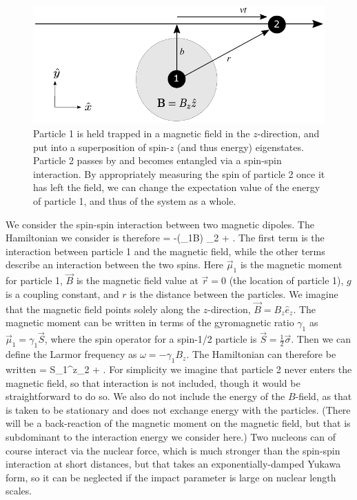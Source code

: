 \documentclass[12pt,aps,prd,onecolumn,nofootinbib,notitlepage]{revtex4-1}
\begin{document}
\begin{figure}[h]
\centering
\includegraphics[width=.6\textwidth]{experiment4.pdf}
\caption{Particle 1 is held trapped in a magnetic field in the $z$-direction, and put into a superposition of spin-$z$ (and thus energy) eigenstates.
Particle 2 passes by and becomes entangled via a spin-spin interaction. By appropriately measuring the spin of particle 2 once it has left the field, we can change the expectation value of the energy of particle 1, and thus of the system as a whole.}
\label{fig:experiment}
\end{figure}

We consider the spin-spin interaction between two magnetic dipoles.
The Hamiltonian we consider is therefore
\be
  \ham =  -({\vec\mu_1}\cdot\vec B) \otimes {}_2
  + .
\ee
The first term is the interaction between particle 1 and the magnetic field, while the other terms describe an interaction between the two spins.
Here $\vec \mu_1$ is the magnetic moment for particle 1, $\vec B$ is the magnetic field value at $\vec r = 0$ (the location of particle 1),  $g$ is a coupling constant, and $r$ is the distance between the particles.
We imagine that the magnetic field points solely along the $z$-direction, $\vec B = B_z\hat{e}_z$.
The magnetic moment can be written in terms of the gyromagnetic ratio $\gamma_1$ as $\vec\mu_1 = \gamma_1\vec{S}$, where the spin operator for a spin-1/2 particle is $\vec{S} = \frac{1}{2}\vec\sigma$.
Then we can define the Larmor frequency as $\omega = -\gamma_1 B_z$.
The Hamiltonian can therefore be written
\be
  \ham =  \omega S_1^z\otimes{}_2 
  + .
  \label{hamiltonian}
\ee
For simplicity we imagine that particle 2 never enters the magnetic field, so that interaction is not included, though it would be straightforward to do so.
We also do not include the energy of the $B$-field, as that is taken to be stationary and does not exchange energy with the particles.
(There will be a back-reaction of the magnetic moment on the magnetic field, but that is subdominant to the interaction energy we consider here.)
Two nucleons can of course interact via the nuclear force, which is much stronger than the spin-spin interaction at short distances, but that takes an exponentially-damped Yukawa form, so it can be neglected if the impact parameter is large on nuclear length scales.
\end{document}
